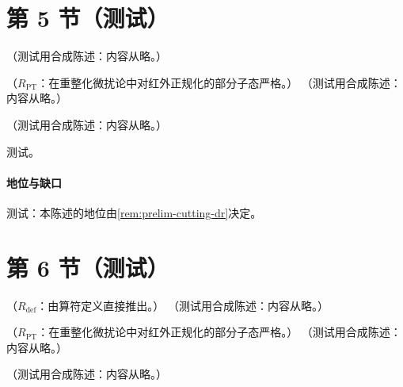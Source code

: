 \section{第 5 节（测试）}\label{sec:ee-oneloop}

\begin{example}[欧氏两圈路线]\label{ex:ee-twoloop-route}
（测试用合成陈述：内容从略。）
\end{example}

\begin{proposition}\label{prop:ee-cutting-exact}
（$R_{\mathrm{PT}}$：在重整化微扰论中对红外正规化的部分子态严格。）
（测试用合成陈述：内容从略。）
\end{proposition}

\begin{corollary}\label{cor:ee-cuts}
（测试用合成陈述：内容从略。）
\end{corollary}
\begin{proofsketch}测试。\end{proofsketch}
\paragraph{地位与缺口}测试：本陈述的地位由\cref{rem:prelim-cutting-dr}决定。

\section{第 6 节（测试）}\label{sec:ee-higher}

\begin{proposition}\label{prop:ee-contour}
（$R_{\mathrm{def}}$：由算符定义直接推出。）
（测试用合成陈述：内容从略。）
\end{proposition}

\begin{corollary}\label{cor:ee-R-alphas}
（$R_{\mathrm{PT}}$：在重整化微扰论中对红外正规化的部分子态严格。）
（测试用合成陈述：内容从略。）
\end{corollary}

\begin{example}[$O(a^3)$ 的 $\pi^2$ 项]\label{ex:ee-pi2}
（测试用合成陈述：内容从略。）
\end{example}

